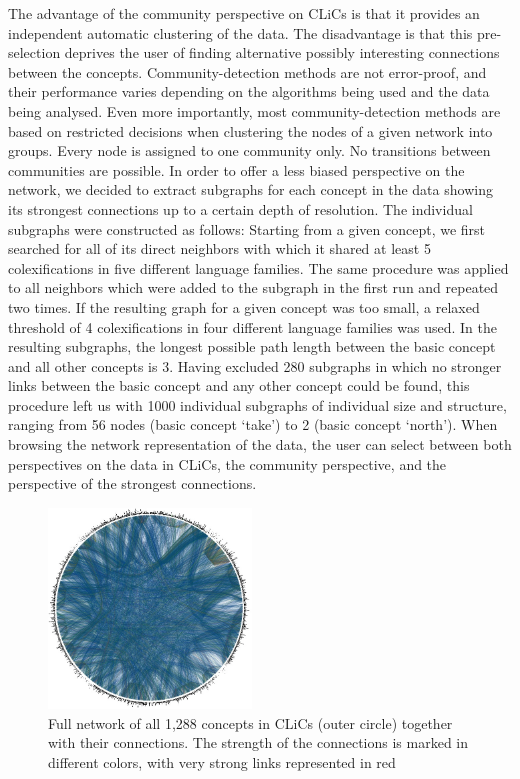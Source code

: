 The advantage of the community perspective on CLiCs is that it provides an independent automatic
clustering of the data. The disadvantage is that this pre-selection deprives the user of finding
alternative possibly interesting connections between the concepts. Community-detection methods are not
error-proof, and their performance varies depending on the algorithms being used and the data being analysed.
Even more importantly, most community-detection methods are based on restricted decisions when
clustering the nodes of a given network into groups. Every node is assigned to one community only.
No transitions between communities are possible. In order to offer a less biased perspective on the
network, we decided to extract subgraphs for each concept in the data showing its strongest
connections up to a certain depth of resolution. The individual subgraphs were constructed as follows: Starting
from a given concept, we first searched for all of its direct neighbors with which it shared at
least 5 colexifications in five different language families. The same procedure was applied to all neighbors
which were added to the subgraph in the first run and repeated two times. If the resulting graph for a given concept was
too small, a relaxed threshold of 4 colexifications in four different language families was used.  
In the resulting subgraphs, the longest possible path length between the basic concept and all other
concepts is 3. Having excluded 280 subgraphs in which no stronger links between the basic concept and any
other concept could be found, this procedure left us with 1000 individual subgraphs of individual
size and structure, ranging from 56 nodes (basic concept `{take}') to 2 (basic concept `{north}'). 
When browsing the network representation of the data, the user can select between both perspectives
on the data in CLiCs, the community perspective, and the perspective of the strongest connections.

\begin{figure}[b]
    \centering
   \includegraphics[width=0.48\textwidth]{img/completeNetworkLabels.jpg}
    \caption{Full network of all 1,288 concepts in CLiCs (outer circle) together with their connections. The strength of the connections is marked in different colors, with very strong links represented in red}
    \label{fig:clics_full}
\end{figure}
